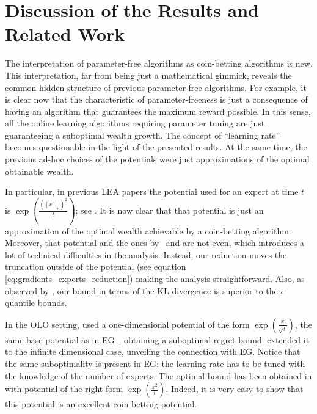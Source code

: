 \section{Discussion of the Results and Related Work}
\label{sec:discussion}

The interpretation of parameter-free algorithms as coin-betting algorithms is
new. This interpretation, far from being just a mathematical gimmick, reveals
the common hidden structure of previous parameter-free algorithms. For example,
it is clear now that the characteristic of parameter-freeness is just a
consequence of having an algorithm that guarantees the maximum reward possible.
In this sense, all the online learning algorithms requiring parameter tuning
are just guaranteeing a suboptimal wealth growth. The concept of
``learning rate'' becomes questionable in the light of the presented results.
At the same time, the previous ad-hoc choices of the potentials were just
approximations of the optimal obtainable wealth.

In particular, in previous \ac{LEA} papers the potential used for an expert at
time $t$ is $\exp \left(\frac{([x]_+)^2}{t} \right)$; see
\citep{ChaudhuriYH09,LuoE14,LuoS15}. It is now clear that that potential is
just an approximation of the optimal wealth achievable by a coin-betting
algorithm.  Moreover, that potential and the ones
by~\citet{ChernovV10} and \cite{KoolenE15} are not even, which introduces a lot of
technical difficulties in the analysis. Instead, our reduction moves the
truncation outside of the potential (see equation
\eqref{eq:gradients_experts_reduction}) making the analysis straightforward.
Also, as observed by \citet{ChernovV10}, our bound in terms of the KL
divergence is superior to the $\epsilon$-quantile bounds.

In the \ac{OLO} setting, \citet{StreeterM12} used a one-dimensional potential
of the form $\exp \left(\frac{|x|}{\sqrt{t}}\right)$, the same base potential
as in \ac{EG}~\citep{KivinenW97}, obtaining a suboptimal regret
bound.  \citet{Orabona13} extended it to the infinite dimensional case,
unveiling the connection with \ac{EG}.  Notice that the same suboptimality is
present in \ac{EG}: the learning rate has to be tuned with the knowledge of the
number of experts.  The optimal bound has been obtained in \citet{McMahanO14}
with potential of the right form $\exp \left(\frac{x^2}{t}\right)$. Indeed, it
is very easy to show that this potential is an excellent coin betting
potential.

